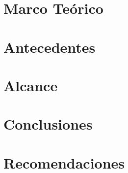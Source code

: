 \documentclass[10pt, letterpaper]{report}
\newcommand{\defaultparformat}[1]{
	{\setlength{\parskip}{2ex}
    }
}
\begin{document}
\ifdefined\CAPmarcoteorico
	\newpage
	\chapter{Marco Teórico}
	\ifdefined\parpordefecto
		\defaultparformat{marco_teorico}
	\else
		
	\fi
\fi

\ifdefined\CAPantecedentes
	\newpage
	\chapter{Antecedentes}
	\ifdefined\parpordefecto
    	\defaultparformat{antecedentes}
    \else
    	
    \fi  
\fi

\ifdefined\CAPalcance
	\newpage
	\chapter{Alcance}
	\ifdefined\parpordefecto
    	\defaultparformat{alcance}
    \else
    	
    \fi 
\fi

\newpage
\ifdefined\parpordefecto
	\defaultparformat{capitulos}
\else
	
\fi

\ifdefined\CAPconclusiones
	\newpage
	\chapter{Conclusiones}
	\ifdefined\parpordefecto
		\defaultparformat{conclusiones}
	\else
		
	\fi
\fi

\ifdefined\CAPrecomendaciones
	\newpage
	\chapter{Recomendaciones}
	\ifdefined\parpordefecto
		\defaultparformat{recomendaciones}
	\else
		
	\fi
\fi

\ifdefined\CAPbibliografia
	\newpage
    \cleardoublepage{}
	\ifdefined\usarAPA
		
	\else
		
	\fi
	
\fi
\end{document}
